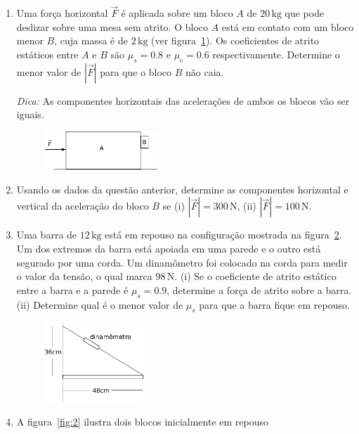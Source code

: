 \documentclass[twocolumn=on,DIV=calc]{scrartcl}
\newcommand{\un}[1]{\mathrm{#1}}
\begin{document}
\begin{enumerate}
\item Uma força horizontal $\vec F$ é aplicada sobre um bloco $A$ de
  $20\,\un{kg}$ que pode deslizar sobre uma mesa sem atrito. O bloco
  $A$ está em contato com um bloco menor $B$, cuja massa é de
  $2\,\un{kg}$ (ver figura~\ref{fig:6}). Os coeficientes de atrito
  estáticos entre $A$ e $B$ são $\mu_s=0.8$ e $\mu_c=0.6$
  respectivamente. Determine o menor valor de $|\vec F|$ para que o
  bloco $B$ não caia.

  \textit{Dica:} As componentes horizontais das acelerações de ambos
  os blocos vão ser iguais.
  \begin{figure}[ht]
    \centering
    \includegraphics[width=0.4\textwidth,keepaspectratio]{lista4-questao6.pdf}
    \caption{}
    \label{fig:6}
  \end{figure}
\item Usando os dados da questão anterior, determine as componentes
  horizontal e vertical da aceleração do bloco $B$ se (i)
  $|\vec F|=300\,\un{N}$, (ii) $|\vec F|=100\,\un{N}$.
\item Uma barra de $12\,\un{kg}$ está em repouso na configuração
  mostrada na figura~\ref{fig:7}. Um dos extremos da barra está
  apoiada em uma parede e o outro está segurado por uma corda. Um
  dinamômetro foi colocado na corda para medir o valor da tensão, o
  qual marca $98\,\un{N}$. (i) Se o coeficiente de atrito estático
  entre a barra e a parede é $\mu_s=0.9$, determine a força de atrito
  sobre a barra. (ii) Determine qual é o menor valor de $\mu_s$ para
  que a barra fique em repouso.
  \begin{figure}[ht]
    \centering
    \includegraphics[width=0.35\textwidth,keepaspectratio]{lista4-questao7.pdf}
    \caption{}
    \label{fig:7}
  \end{figure}
\item A figura~\ref{fig:2} ilustra dois blocos inicialmente em repouso

\end{enumerate}
\end{document}
